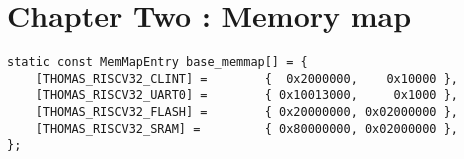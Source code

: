 \newpage
\section{Chapter Two : Memory map}

\lstset{
    basicstyle=\tt,
}
\lstset{language=C}
\begin{lstlisting} 
static const MemMapEntry base_memmap[] = {
    [THOMAS_RISCV32_CLINT] =        {  0x2000000,    0x10000 },
    [THOMAS_RISCV32_UART0] =        { 0x10013000,     0x1000 },
    [THOMAS_RISCV32_FLASH] =        { 0x20000000, 0x02000000 },
    [THOMAS_RISCV32_SRAM] =         { 0x80000000, 0x02000000 },
};
\end{lstlisting}
